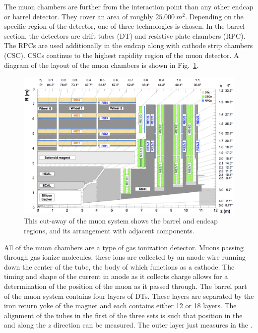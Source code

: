 The muon chambers are further from the interaction point than any other endcap or barrel detector.  They cover an area of roughly \ensuremath{\SI{25,000}{m^2}}.  Depending on the specific region of the detector, one of three technologies is chosen.  In the barrel section, the detectors are drift tubes (DT) and resistive plate chambers (RPC).  The RPCs are used additionally in the endcap along with cathode strip chambers (CSC).  CSCs continue to the highest rapidity region of the muon detector.  A diagram of the layout of the muon chambers is shown in Fig.~\ref{fig:muonchambers}.

\begin{figure}[!tp]
    \centering
    \includegraphics[width=\textwidth]{figures/muonSystem.png}
    \caption[
       \CMS muon chambers diagram.
    ]{
        This cut-away of the muon system shows the barrel and endcap regions, and its arrangement with adjacent \CMS components.\cite{muonDPG13TeV}
    }
    \label{fig:muonchambers}
\end{figure}

All of the muon chambers are a type of gas ionization detector.  Muons passing through gas ionize molecules, these ions are collected by an anode wire running down the center of the tube, the body of which functions as a cathode.  The timing and shape of the current in anode as it collects charge allows for a determination of the position of the muon as it passed through.  The barrel part of the muon system contains four layers of DTs.  These layers are separated by the iron return yoke of the magnet and each contains either 12 or 18 layers.  The alignment of the tubes in the first of the three sets is such that position in the \rphiplane and along the \ensuremath{z} direction can be measured.  The outer layer just measures in the \rphiplane.

